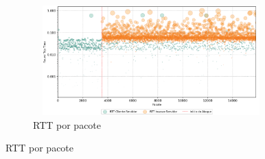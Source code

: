 \begin{apendicesenv}
\begin{figure}[htbp!]
\begin{subfigure}[t]{0.5\textwidth}
        \centering
        \caption{RTT por pacote}
        \includegraphics[width=1\textwidth, height=120pt]{USPSC-img/output/cropped/1-dos_open_multiple_secure_channels-rttp.png}
    \end{subfigure}%
\end{figure}


\end{apendicesenv}
